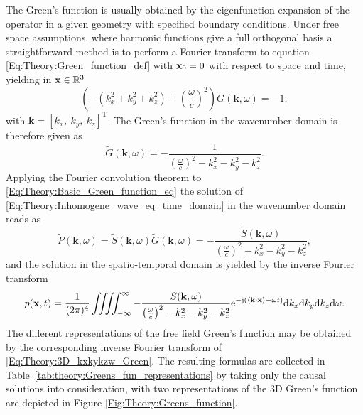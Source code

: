 The Green's function is usually obtained by the eigenfunction expansion of the operator in a given geometry with specified boundary conditions. 
Under free space assumptions, where harmonic functions give a full orthogonal basis a straightforward method is to perform a Fourier transform to equation \eqref{Eq:Theory:Green_function_def} with $\mathbf{x}_0 = 0$ with respect to space and time, yielding in $\mathbf{x} \in \mathbb{R}^{3}$
\begin{equation}
\left(-(k_x^2 + k_y^2 + k_z^2) + \left(\frac{\omega}{c} \right)^2\right)\tilde{G}(\mathbf{k},\omega) = -1,
\end{equation}
with $\mathbf{k} = [k_x,\ k_y,\ k_z]^{\mathrm{T}}$.
The Green's function in the wavenumber domain is therefore given as \cite{Devaney2012, Watanabe2015}
\begin{equation}
\tilde{G}(\mathbf{k},\omega) = -\frac{1}{\left( \frac{\omega}{c}\right)^2 -  k_x^2 - k_y^2 - k_z^2 }.
\label{Eq:Theory:3D_kxkykzw_Green}
\end{equation}
Applying the Fourier convolution theorem to \eqref{Eq:Theory:Basic_Green_function_eq} the solution of \eqref{Eq:Theory:Inhomogene_wave_eq_time_domain} in the wavenumber domain reads as
\begin{equation}
\tilde{P}(\mathbf{k},\omega)  = \tilde{S}(\mathbf{k},\omega) \tilde{G}(\mathbf{k},\omega) = -\frac{\tilde{S}(\mathbf{k},\omega)}{\left( \frac{\omega}{c}\right)^2 -  k_x^2 - k_y^2 - k_z^2 },
\end{equation}
and the solution in the spatio-temporal domain is yielded by the inverse Fourier transform
\begin{equation}
p(\mathbf{x},t) =\frac{1}{(2\pi)^4} \iiiint^{\infty}_{-\infty} - \frac{\tilde{S}(\mathbf{k},\omega)}{\left( \frac{\omega}{c}\right)^2 -  k_x^2 - k_y^2 - k_z^2 } \mathrm{e}^{-\mathrm{j} \left( \left< \mathbf{k} \cdot \mathbf{x} \right> - \omega t \right) } \mathrm{d} k_x \mathrm{d} k_y \mathrm{d} k_z \mathrm{d} \omega.
\end{equation}
The different representations of the free field Green's function may be obtained by the corresponding inverse Fourier transform of \eqref{Eq:Theory:3D_kxkykzw_Green}.
The resulting formulas are collected in Table\ \ref{tab:theory:Greens_fun_representations} by taking only the causal solutions into consideration,
with two representations of the 3D Green's function are depicted in Figure \ref{Fig:Theory:Greens_function}.

